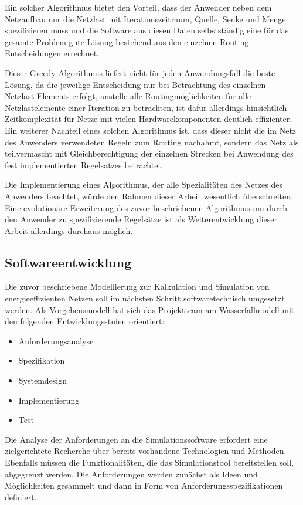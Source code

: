 Ein solcher Algorithmus bietet den Vorteil, dass der Anwender neben dem Netzaufbau nur die Netzlast mit Iterationszeitraum, Quelle, Senke und Menge spezifizieren muss und die Software aus diesen Daten selbstständig eine für das gesamte Problem  gute Lösung bestehend aus den einzelnen Routing-Entscheidungen errechnet.


Dieser Greedy-Algorithmus liefert nicht für jeden Anwendungsfall die beste Lösung, da die jeweilige Entscheidung nur bei Betrachtung des einzelnen Netzlast-Elements erfolgt, anstelle alle Routingmöglichkeiten für alle Netzlastelemente einer Iteration zu betrachten, ist dafür allerdings hinsichtlich Zeitkomplexität für Netze mit vielen Hardwarekomponenten deutlich effizienter.
Ein weiterer Nachteil eines solchen Algorithmus ist, dass dieser nicht die im Netz des Anwenders verwendeten Regeln zum Routing nachahmt, sondern das Netz als teilvermascht mit Gleichberechtigung der einzelnen Strecken bei Anwendung des fest implementierten Regelsatzes betrachtet.


Die Implementierung eines Algorithmus, der alle Spezialitäten des Netzes des Anwenders beachtet, würde den Rahmen dieser Arbeit wesentlich überschreiten. Eine evolutionäre Erweiterung des zuvor beschriebenen Algorithmus um durch den Anwender zu spezifizierende Regelsätze ist als Weiterentwicklung dieser Arbeit allerdings durchaus möglich.


\subsection{Softwareentwicklung}\label{subsec:VorgSoftwareEng}
Die zuvor beschriebene Modellierung zur Kalkulation und Simulation von energieeffizienten Netzen soll im nächsten Schritt softwaretechnisch umgesetzt werden. Als Vorgehensmodell hat sich das Projektteam am Wasserfallmodell mit den folgenden Entwicklungsstufen orientiert:
\begin{itemize}
\item Anforderungsanalyse
\item Spezifikation
\item Systemdesign
\item Implementierung
\item Test
\end{itemize}
Die Analyse der Anforderungen an die Simulationssoftware erfordert eine zielgerichtete Recherche über bereits vorhandene Technologien und Methoden. Ebenfalls müssen die Funktionalitäten, die das Simulationstool bereitstellen soll, abgegrenzt werden. Die Anforderungen werden zunächst als Ideen und Möglichkeiten gesammelt und dann in Form von Anforderungsspezifikationen definiert. 


